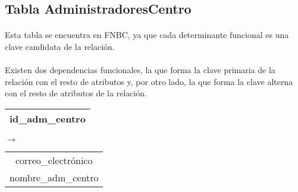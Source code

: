 \subsection{Tabla AdministradoresCentro}

  \paragraph{}Esta tabla se encuentra en FNBC, ya que cada determinante
  funcional es una clave candidata de la relación.

  \paragraph{}Existen dos dependencias funcionales, la que forma la clave
  primaria de la relación con el resto de atributos y, por otro lado, la que
  forma la clave alterna con el resto de atributos de la relación.

  \begin{center}
    \begin{minipage}{3.7cm}{\begin{flushright}\begin{tabular}{ | c | }
                  \hline
                  id\_adm\_centro \\
                  \hline
                 \end{tabular}\end{flushright} }
    \end{minipage}
    \begin{minipage}{0.7cm}{$\longrightarrow$}
    \end{minipage}
    \begin{minipage}{5.9cm}{\begin{tabular}{ | c | }
                  \hline
                  correo\_electrónico \\
                  nombre\_adm\_centro \\
                  \hline
                 \end{tabular} }
    \end{minipage}
  \end{center}

